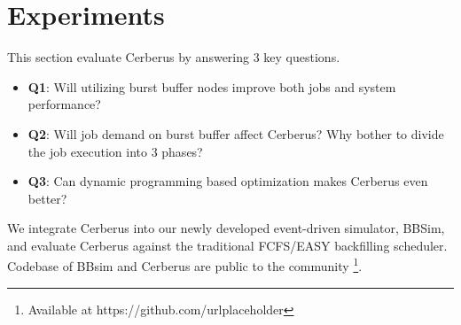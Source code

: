 \section{Experiments}
\label{Sec:Experiments}


This section evaluate Cerberus by answering 3 key questions.
\begin{itemize}
        \item \textbf{Q1}: Will utilizing burst buffer nodes 
        improve both jobs and system performance?
        \item \textbf{Q2}: Will job demand on burst buffer affect Cerberus?
                Why bother to divide the job execution into 3 phases?
        \item \textbf{Q3}: Can dynamic programming based optimization
                makes Cerberus even better?
\end{itemize}
We integrate Cerberus into our newly developed event-driven simulator, 
BBSim, and evaluate Cerberus against the traditional FCFS/EASY backfilling scheduler.
Codebase of BBsim and Cerberus are public to the community
\footnote{Available at https://github.com/urlplaceholder}.


